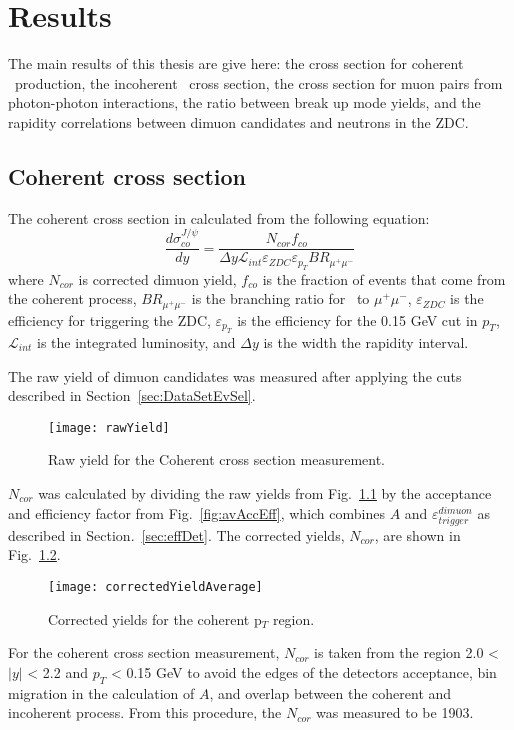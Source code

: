 \chapter{Results} 
  The main results of this thesis are give here:
    the cross section for coherent \JPsi~production, the incoherent \JPsi~cross
    section, the cross section for muon pairs from photon-photon interactions,
    the ratio between break up mode yields, and the rapidity correlations 
    between dimuon candidates and neutrons in the ZDC.

  \section{Coherent cross section}
  The coherent cross section in calculated from the following equation:
  \begin{equation}
    \frac{d\sigma^{J/\psi}_{co}}{dy}  = \frac{N_{cor} f_{co}  }
    { \Delta y\mathcal{L}_{int} \varepsilon_{ZDC} \varepsilon_{p_{T}} 
      BR_{\mu^{+}\mu^{-}}}
    \label{eq:expXSecCo}
   \end{equation}
   where $N_{cor}$ is corrected dimuon yield, $f_{co}$ is the 
     fraction of events that come from the coherent process, 
     $BR_{\mu^{+}\mu^{-}}$ is the branching ratio for \JPsi~to $\mu^{+}\mu^{-}$, 
     $\varepsilon_{ZDC}$ is the efficiency for triggering the ZDC, 
     $\varepsilon_{p_{T}}$ is the efficiency for the 0.15 GeV cut in $p_{T}$, 
     $\mathcal{L}_{int}$ is the integrated luminosity, and $\Delta y$ is the 
     width the rapidity interval.

  The raw yield of dimuon candidates was measured after applying the cuts 
    described in Section~\ref{sec:DataSetEvSel}.
  \begin{figure}[!Hhtb]
    \centering
    \texttt{[image: rawYield]}
    \caption{Raw yield for the Coherent cross section measurement.}
    \label{fig:rawYieldCo}
  \end{figure}
  $N_{cor}$ was calculated by dividing the raw yields from 
    Fig.~\ref{fig:rawYieldCo} by the acceptance and efficiency factor from 
    Fig.~\ref{fig:avAccEff}, which combines $A$ and 
    $\varepsilon^{dimuon}_{trigger}$ as described in Section.~\ref{sec:effDet}.
  The corrected yields, $N_{cor}$, are shown in Fig.~\ref{fig:corYieldCo}.
  \begin{figure}[!Hhtb]
    \centering
    \texttt{[image: correctedYieldAverage]}
    \caption{Corrected yields for the coherent p$_{T}$ region.}
    \label{fig:corYieldCo}
  \end{figure}
  For the coherent cross section measurement, $N_{cor}$ is taken from the 
    region 2.0 < $|y|$ < 2.2 and $p_{T}$ < 0.15 GeV to avoid the edges of the
    detectors acceptance, bin migration in the calculation of $A$, and overlap
    between the coherent and incoherent process.
  From this procedure, the $N_{cor}$ was measured to be 1903.
  
